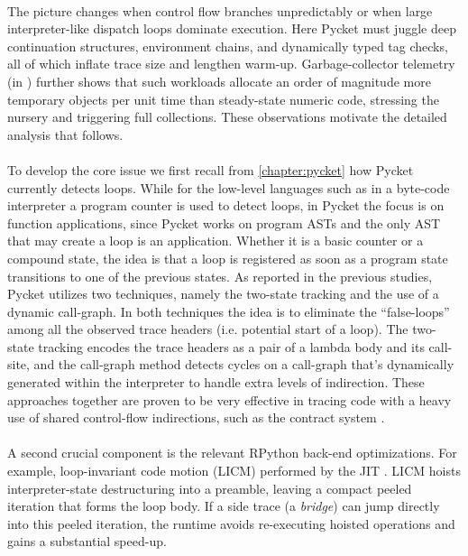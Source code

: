 	\paragraph{}%
		The picture changes when control flow branches unpredictably or when large interpreter-like dispatch loops dominate execution. Here Pycket must juggle deep continuation structures, environment chains, and dynamically typed tag checks, all of which inflate trace size and lengthen warm-up. Garbage-collector telemetry (in ) further shows that such workloads allocate an order of magnitude more temporary objects per unit time than steady-state numeric code, stressing the nursery and triggering full collections. These observations motivate the detailed analysis that follows.

	\paragraph{}%
		To develop the core issue we first recall from \ref{chapter:pycket} how Pycket currently detects loops. While for the low-level languages such as in a byte-code interpreter a program counter is used to detect loops, in Pycket the focus is on function applications, since Pycket works on program ASTs and the only AST that may create a loop is an application. Whether it is a basic counter or a compound state, the idea is that a loop is registered as soon as a program state transitions to one of the previous states. As reported in the previous studies, Pycket utilizes two techniques, namely the two-state tracking and the use of a dynamic call-graph. In both techniques the idea is to eliminate the “false-loops” among all the observed trace headers (i.e. potential start of a loop). The two-state tracking encodes the trace headers as a pair of a lambda body and its call-site, and the call-graph method detects cycles on a call-graph that's dynamically generated within the interpreter to handle extra levels of indirection. These approaches together are proven to be very effective in tracing code with a heavy use of shared control-flow indirections, such as the contract system \cite{pycketmain,pycketmain2}.

	\paragraph{}%
		A second crucial component is the relevant RPython back-end optimizations. For example, loop-invariant code motion (LICM) performed by the JIT \cite{loop-aware:12}. LICM hoists interpreter-state destructuring into a preamble, leaving a compact peeled iteration that forms the loop body. If a side trace (a \emph{bridge}) can jump directly into this peeled iteration, the runtime avoids re-executing hoisted operations and gains a substantial speed-up.

